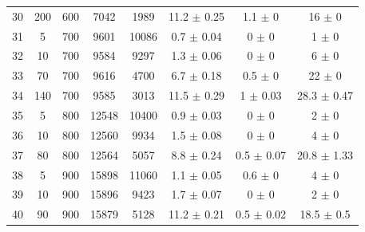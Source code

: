 \documentclass[11pt]{article}
\begin{document}
\begin{table}[]
{\begin{tabular}{cccccccc}
				30 & 200 & 600 & 7042 & 1989 & 11.2 $\pm$ 0.25 & 1.1 $\pm$ 0 & 16 $\pm$ 0 \\
				\rowcolor[HTML]{EFEFEF} 
				31 & 5 & 700 & 9601 & 10086 & 0.7 $\pm$ 0.04 & 0 $\pm$ 0 & 1 $\pm$ 0 \\
				\rowcolor[HTML]{EFEFEF} 
				32 & 10 & 700 & 9584 & 9297 & 1.3 $\pm$ 0.06 & 0 $\pm$ 0 & 6 $\pm$ 0 \\
				\rowcolor[HTML]{EFEFEF} 
				33 & 70 & 700 & 9616 & 4700 & 6.7 $\pm$ 0.18 & 0.5 $\pm$ 0 & 22 $\pm$ 0 \\
				\rowcolor[HTML]{EFEFEF} 
				34 & 140 & 700 & 9585 & 3013 & 11.5 $\pm$ 0.29 & 1 $\pm$ 0.03 & 28.3 $\pm$ 0.47 \\
				35 & 5 & 800 & 12548 & 10400 & 0.9 $\pm$ 0.03 & 0 $\pm$ 0 & 2 $\pm$ 0 \\
				36 & 10 & 800 & 12560 & 9934 & 1.5 $\pm$ 0.08 & 0 $\pm$ 0 & 4 $\pm$ 0 \\
				37 & 80 & 800 & 12564 & 5057 & 8.8 $\pm$ 0.24 & 0.5 $\pm$ 0.07 & 20.8 $\pm$ 1.33 \\
				\rowcolor[HTML]{EFEFEF} 
				38 & 5 & 900 & 15898 & 11060 & 1.1 $\pm$ 0.05 & 0.6 $\pm$ 0 & 4 $\pm$ 0 \\
				\rowcolor[HTML]{EFEFEF} 
				39 & 10 & 900 & 15896 & 9423 & 1.7 $\pm$ 0.07 & 0 $\pm$ 0 & 2 $\pm$ 0 \\
				\rowcolor[HTML]{EFEFEF} 
				40 & 90 & 900 & 15879 & 5128 & 11.2 $\pm$ 0.21 & 0.5 $\pm$ 0.02 & 18.5 $\pm$ 0.5
			\end{tabular}%
		}
	\end{table}
	
\end{document}
